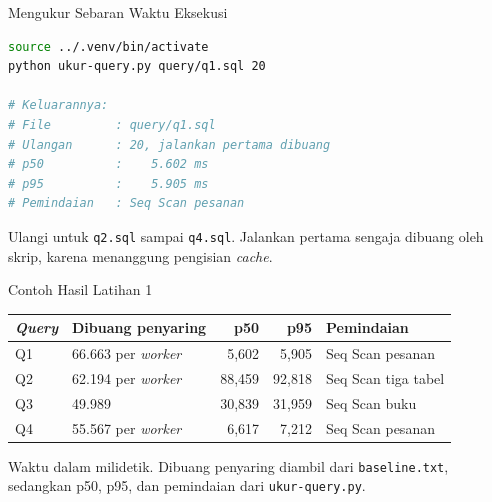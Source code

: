 \documentclass[aspectratio=169, table, 12pt]{beamer}
\begin{document}
\begin{frame}[fragile]{{\Large Mengukur Sebaran Waktu Eksekusi}}
  \vspace{3pt}
\begin{lstlisting}[language=bash]
source ../.venv/bin/activate
python ukur-query.py query/q1.sql 20

# Keluarannya:
# File         : query/q1.sql
# Ulangan      : 20, jalankan pertama dibuang
# p50          :    5.602 ms
# p95          :    5.905 ms
# Pemindaian   : Seq Scan pesanan
\end{lstlisting}

  \vspace{3pt}
  {\footnotesize Ulangi untuk \texttt{q2.sql} sampai \texttt{q4.sql}.
  Jalankan pertama sengaja dibuang oleh skrip, karena menanggung pengisian
  \textit{cache}.}
\end{frame}

\begin{frame}{{\Large Contoh Hasil Latihan 1}}
  \vspace{5pt}
  {\centering
  {\small
  \begin{tabularx}{\textwidth}{lXrrl}
    \hline
    \textbf{\textit{Query}} & \textbf{Dibuang penyaring} & \textbf{p50} & \textbf{p95} & \textbf{Pemindaian} \\
    \hline
    Q1 & 66.663 per \textit{worker} & 5,602 & 5,905 & Seq Scan pesanan \\
    \hline
    Q2 & 62.194 per \textit{worker} & 88,459 & 92,818 & Seq Scan tiga tabel \\
    \hline
    Q3 & 49.989 & 30,839 & 31,959 & Seq Scan buku \\
    \hline
    Q4 & 55.567 per \textit{worker} & 6,617 & 7,212 & Seq Scan pesanan \\
    \hline
  \end{tabularx}}\par}

  \vspace{8pt}
  {\footnotesize Waktu dalam milidetik. Dibuang penyaring diambil dari
  \texttt{baseline.txt}, sedangkan p50, p95, dan pemindaian dari
  \texttt{ukur-query.py}.}
\end{frame}
\end{document}
